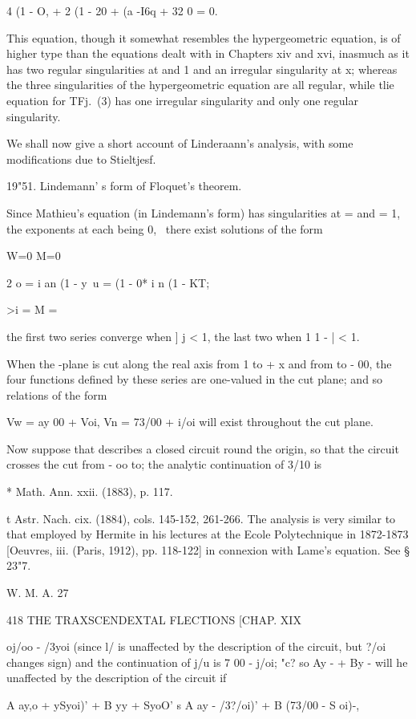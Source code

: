 4 (1 - O, + 2 (1 - 20 + (a -I6q + 32 0 = 0.

This equation, though it somewhat resembles the hypergeometric
equation, is of higher type than the equations dealt with in Chapters
xiv and xvi, inasmuch as it has two regular singularities at and 1 and
an irregular singularity at x; whereas the three singularities of the
hypergeometric equation are all regular, while tlie equation for TFj.\
(3) has one irregular singularity and only one regular singularity.

We shall now give a short account of Linderaann's analysis, with some
modifications due to Stieltjesf.

19"51. Lindemann' s form of Floquet's theorem.

Since Mathieu's equation (in Lindemann's form) has singularities at =
and = 1, the exponents at each being 0, \, there exist solutions of
the form

W=0 M=0

2 o = i an (1 - y\ u = (1 - 0* i n (1 - KT;

>i = M =

the first two series converge when ] j < 1, the last two when 1 1 - |
< 1.

When the -plane is cut along the real axis from 1 to + x and from to -
00, the four functions defined by these series are one-valued in the
cut plane; and so relations of the form

Vw = ay 00 + Voi, Vn = 73/00 + i/oi will exist throughout the cut
plane.

Now suppose that describes a closed circuit round the origin, so that
the circuit crosses the cut from - oo to; the analytic continuation
of 3/10 is

* Math. Ann. xxii. (1883), p. 117.

t Astr. Nach. cix. (1884), cols. 145-152, 261-266. The analysis is
very similar to that employed by Hermite in his lectures at the Ecole
Polytechnique in 1872-1873 [Oeuvres, iii. (Paris, 1912), pp. 118-122]
in connexion with Lame's equation. See § 23"7.

W. M. A. 27

418 THE TRAXSCENDEXTAL FLECTIONS [CHAP. XIX

oj/oo - /3yoi (since l/ is unaffected by the description of the
circuit, but ?/oi changes sign) and the continuation of j/u is 7 00 -
j/oi; "c? so Ay - + By - will he unaffected by the description of the
circuit if

A ay,o + ySyoi)' + B yy + SyoO' s A ay - /3?/oi)' + B (73/00 - S oi)-,


